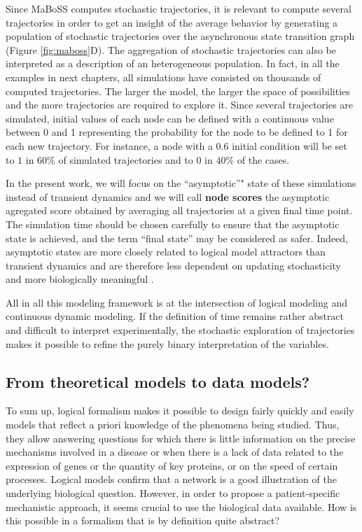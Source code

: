\documentclass[a4paper,12pt,twoside,onecolumn,openright,final,oldfontcommands]{memoir}
\begin{document}
Since MaBoSS computes stochastic trajectories, it is relevant to compute
several trajectories in order to get an insight of the average behavior
by generating a population of stochastic trajectories over the
asynchronous state transition graph (Figure \ref{fig:maboss}D). The
aggregation of stochastic trajectories can also be interpreted as a
description of an heterogeneous population. In fact, in all the examples
in next chapters, all simulations have consisted on thousands of
computed trajectories. The larger the model, the larger the space of
possibilities and the more trajectories are required to explore it.
Since several trajectories are simulated, initial values of each node
can be defined with a continuous value between 0 and 1 representing the
probability for the node to be defined to 1 for each new trajectory. For
instance, a node with a 0.6 initial condition will be set to \(1\) in
\(60\%\) of simulated trajectories and to \(0\) in \(40\%\) of the
cases.

In the present work, we will focus on the ``asymptotic''" state of these
simulations instead of transient dynamics and we will call \textbf{node
scores} the asymptotic agregated score obtained by averaging all
trajectories at a given final time point. The simulation time should be
chosen carefully to ensure that the asymptotic state is achieved, and
the term ``final state'' may be considered as safer. Indeed, asymptotic
states are more closely related to logical model attractors than
transient dynamics and are therefore less dependent on updating
stochasticity and more biologically meaningful \citep{huang2009cancer}.

All in all this modeling framework is at the intersection of logical
modeling and continuous dynamic modeling. If the definition of time
remains rather abstract and difficult to interpret experimentally, the
stochastic exploration of trajectories makes it possible to refine the
purely binary interpretation of the variables.

\subsection{From theoretical models to data
models?}\label{from-theoretical-models-to-data-models}

To sum up, logical formalism makes it possible to design fairly quickly
and easily models that reflect a priori knowledge of the phenomena being
studied. Thus, they allow answering questions for which there is little
information on the precise mechanisms involved in a disease or when
there is a lack of data related to the expression of genes or the
quantity of key proteins, or on the speed of certain processes. Logical
models confirm that a network is a good illustration of the underlying
biological question. However, in order to propose a patient-specific
mechanistic approach, it seems crucial to use the biological data
available. How is this possible in a formalism that is by definition
quite abstract?
\end{document}
